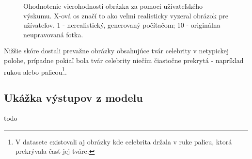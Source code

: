 \documentclass [11pt, a4paper]{article}
\begin{document}
		\begin{figure}[h!]
			\begin{center}
				\caption{Ohodnotenie vierohodnosti obrázka za pomoci užívateľského výskumu. X-ová os značí to ako veľmi realisticky vyzeral obrázok pre užívateľov. 1 - nerealistický, generovaný počítačom; 10 - originálna neupravovaná fotka.}
				\label{user_research}
			\end{center}
		\end{figure}
		
		Nižšie skóre dostali prevažne obrázky obsahujúce tvár celebrity v netypickej polohe, prípadne pokiaľ bola tvár celebrity niečím čiastočne prekrytá - napríklad rukou alebo palicou\footnote{V datasete existovali aj obrázky kde celebrita držala v ruke palicu, ktorá prekrývala časť jej tváre.}.
		
		
	
	\newpage
	\renewcommand{\refname}{Zdroje}
	
	
	
	\begin{appendices}
		\section{Ukážka výstupov z modelu}
		todo
	\end{appendices}
\end{document}
